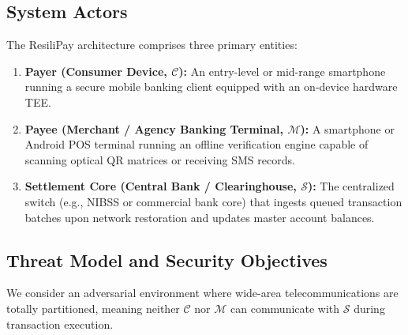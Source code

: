 \documentclass[conference]{IEEEtran}
\begin{document}
\subsection{System Actors}
The ResiliPay architecture comprises three primary entities:
\begin{enumerate}
    \item \textbf{Payer (Consumer Device, $\mathcal{C}$):} An entry-level or mid-range smartphone running a secure mobile banking client equipped with an on-device hardware TEE.
    \item \textbf{Payee (Merchant / Agency Banking Terminal, $\mathcal{M}$):} A smartphone or Android POS terminal running an offline verification engine capable of scanning optical QR matrices or receiving SMS records.
    \item \textbf{Settlement Core (Central Bank / Clearinghouse, $\mathcal{S}$):} The centralized switch (e.g., NIBSS or commercial bank core) that ingests queued transaction batches upon network restoration and updates master account balances.
\end{enumerate}

\subsection{Threat Model and Security Objectives}
We consider an adversarial environment where wide-area telecommunications are totally partitioned, meaning neither $\mathcal{C}$ nor $\mathcal{M}$ can communicate with $\mathcal{S}$ during transaction execution.
\end{document}
